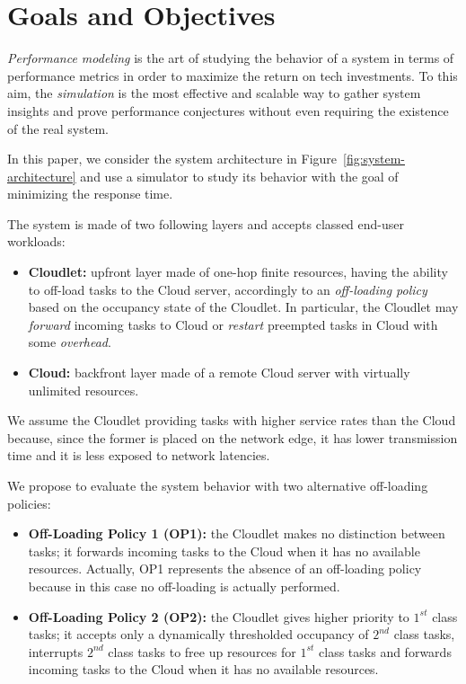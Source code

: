 \section{Goals and Objectives}
\label{sec:performance-modeling-goals-and-objectives}
\textit{Performance modeling} is the art of studying the behavior of a system in terms of performance metrics in order to maximize the return on tech investments.
To this aim, the \textit{simulation} is the most effective and scalable way to gather system insights and prove performance conjectures without even requiring the existence of the real system.

In this paper, we consider the system architecture in Figure~\ref{fig:system-architecture} and use a simulator to study its behavior with the goal of minimizing the response time.

The system is made of two following layers and accepts classed end-user workloads:

\begin{itemize}
		\item \textbf{Cloudlet:} upfront layer made of one-hop finite resources, having the ability to off-load tasks to the Cloud server, accordingly to an \textit{off-loading policy} based on the occupancy state of the Cloudlet. In particular, the Cloudlet may \textit{forward} incoming tasks to Cloud or \textit{restart} preempted tasks in Cloud with some \textit{overhead}. 
		
		\item \textbf{Cloud:} backfront layer made of a remote Cloud server with virtually unlimited resources.
\end{itemize}

We assume the Cloudlet  providing tasks with higher service rates than the Cloud because, since the former is placed on the network edge, it has lower transmission time and it is less exposed to network latencies.

We propose to evaluate the system behavior with two alternative off-loading policies:

\begin{itemize}
	\item \textbf{Off-Loading Policy 1 (OP1):} the Cloudlet makes no distinction between tasks; it forwards incoming tasks to the Cloud when it has no available resources. Actually, OP1 represents the absence of an off-loading policy because in this case no off-loading is actually performed.
	
	\item \textbf{Off-Loading Policy 2 (OP2):} the Cloudlet gives higher priority to $1^{st}$ class tasks; it accepts only a dynamically thresholded occupancy of $2^{nd}$ class tasks, interrupts $2^{nd}$ class tasks to free up resources for $1^{st}$ class tasks and forwards incoming tasks to the Cloud when it has no available resources.
\end{itemize}

